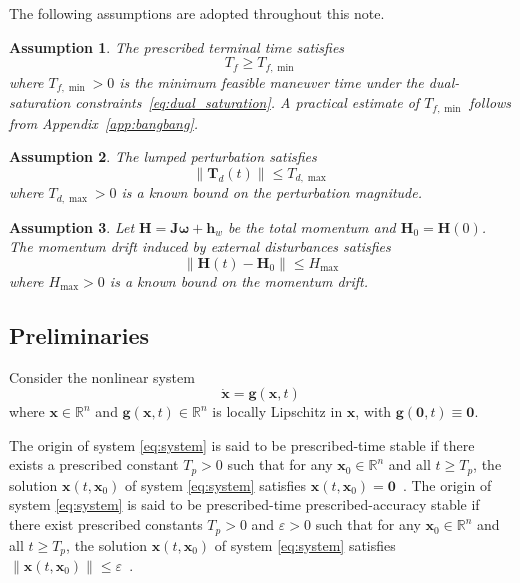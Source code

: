 \documentclass[journal]{new-aiaa}
\newtheorem{assumption}{Assumption}
\begin{document}
The following assumptions are adopted throughout this note.

\begin{assumption}\label{ass:feasible_Tf}
The prescribed terminal time satisfies
\begin{equation}
T_f \ge T_{f,\min}
\label{eq:T_f_feasible}
\end{equation}
where $T_{f,\min}>0$ is the minimum feasible maneuver time under the dual-saturation constraints~\eqref{eq:dual_saturation}.
A practical estimate of $T_{f,\min}$ follows from Appendix~\ref{app:bangbang}.
\end{assumption}

\begin{assumption}\label{ass:disturbance_bound}
The lumped perturbation satisfies
\begin{equation}
\|\boldsymbol{T}_d(t)\| \le T_{d,\max}
\label{eq:Td_bound}
\end{equation}
where $T_{d,\max}>0$ is a known bound on the perturbation magnitude.
\end{assumption}

\begin{assumption}\label{ass:H_budget}
Let $\boldsymbol{H}=\boldsymbol{J}\boldsymbol{\omega}+\boldsymbol{h}_w$ be the total momentum and $\boldsymbol{H}_0=\boldsymbol{H}(0)$.
The momentum drift induced by external disturbances satisfies
\begin{equation}
\|\boldsymbol{H}(t)-\boldsymbol{H}_0\| \le H_{\max}
\label{eq:Hmax}
\end{equation}
where $H_{\max} > 0$ is a known bound on the momentum drift.
\end{assumption}

\subsection{Preliminaries}
Consider the nonlinear system
\begin{equation}
\dot{\boldsymbol{x}} = \boldsymbol{g}(\boldsymbol{x},t)
\label{eq:system}
\end{equation}
where $\boldsymbol{x}\in\mathbb{R}^n$ and $\boldsymbol{g}(\boldsymbol{x},t)\in\mathbb{R}^n$ is locally Lipschitz in $\boldsymbol{x}$, with $\boldsymbol{g}(\boldsymbol{0},t)\equiv\boldsymbol{0}$.

The origin of system \eqref{eq:system} is said to be prescribed-time stable if there exists a prescribed constant $T_p>0$ such that for any $\boldsymbol{x}_0\in\mathbb{R}^n$ and all $t\ge T_p$, the solution $\boldsymbol{x}(t,\boldsymbol{x}_0)$ of system \eqref{eq:system} satisfies $\boldsymbol{x}(t,\boldsymbol{x}_0)=\boldsymbol{0}$~\cite{sanchez-torres_predefined-time_2015}. The origin of system \eqref{eq:system} is said to be prescribed-time prescribed-accuracy stable if there exist prescribed constants $T_p>0$ and $\varepsilon>0$ such that for any $\boldsymbol{x}_0\in\mathbb{R}^n$ and all $t\ge T_p$, the solution $\boldsymbol{x}(t,\boldsymbol{x}_0)$ of system \eqref{eq:system} satisfies $\|\boldsymbol{x}(t,\boldsymbol{x}_0)\|\le\varepsilon$~\cite{xiao_scaling-transformation-based_2025}.
\end{document}

